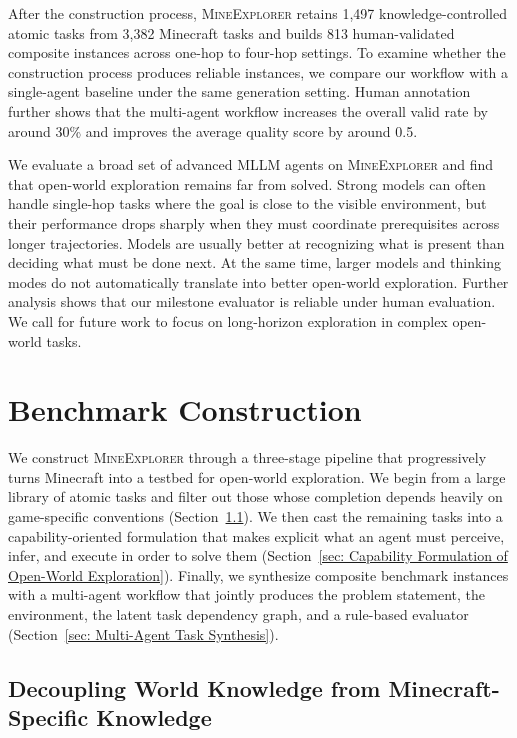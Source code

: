 \documentclass[11pt]{article}
\begin{document}
After the construction process, \textsc{MineExplorer} retains 1,497 knowledge-controlled atomic tasks from 3,382 Minecraft tasks and builds 813 human-validated composite instances across one-hop to four-hop settings. 
To examine whether the construction process produces reliable instances, we compare our workflow with a single-agent baseline under the same generation setting. 
Human annotation further shows that the multi-agent workflow increases the overall valid rate by around 30\% and improves the average quality score by around 0.5.

We evaluate a broad set of advanced MLLM agents on \textsc{MineExplorer} and find that open-world exploration remains far from solved. 
Strong models can often handle single-hop tasks where the goal is close to the visible environment, but their performance drops sharply when they must coordinate prerequisites across longer trajectories. 
Models are usually better at recognizing what is present than deciding what must be done next. 
At the same time, larger models and thinking modes do not automatically translate into better open-world exploration. 
Further analysis shows that our milestone evaluator is reliable under human evaluation. 
We call for future work to focus on long-horizon exploration in complex open-world tasks.

\section{Benchmark Construction}

We construct \textsc{MineExplorer} through a three-stage pipeline that progressively turns Minecraft into a testbed for open-world exploration. 
We begin from a large library of atomic tasks and filter out those whose completion depends heavily on game-specific conventions (Section~\ref{sec: Decoupling World Knowledge from Minecraft-Specific Knowledge}). 
We then cast the remaining tasks into a capability-oriented formulation that makes explicit what an agent must perceive, infer, and execute in order to solve them (Section~\ref{sec: Capability Formulation of Open-World Exploration}). 
Finally, we synthesize composite benchmark instances with a multi-agent workflow that jointly produces the problem statement, the environment, the latent task dependency graph, and a rule-based evaluator (Section~\ref{sec: Multi-Agent Task Synthesis}).

\subsection{Decoupling World Knowledge from Minecraft-Specific Knowledge}
\label{sec: Decoupling World Knowledge from Minecraft-Specific Knowledge}
\end{document}
